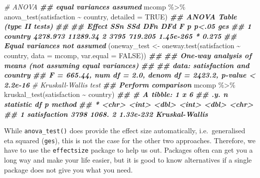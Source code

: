 \documentclass[
]{book}
\newenvironment{Shaded}{\begin{snugshade}}{\end{snugshade}}
\newcommand{\AttributeTok}[1]{\textcolor[rgb]{0.77,0.63,0.00}{#1}}
\newcommand{\CommentTok}[1]{\textcolor[rgb]{0.56,0.35,0.01}{\textit{#1}}}
\newcommand{\ConstantTok}[1]{\textcolor[rgb]{0.00,0.00,0.00}{#1}}
\newcommand{\DocumentationTok}[1]{\textcolor[rgb]{0.56,0.35,0.01}{\textbf{\textit{#1}}}}
\newcommand{\FunctionTok}[1]{\textcolor[rgb]{0.00,0.00,0.00}{#1}}
\newcommand{\NormalTok}[1]{#1}
\newcommand{\OtherTok}[1]{\textcolor[rgb]{0.56,0.35,0.01}{#1}}
\newcommand{\SpecialCharTok}[1]{\textcolor[rgb]{0.00,0.00,0.00}{#1}}
\begin{document}
\begin{Shaded}
\begin{Highlighting}[]
\CommentTok{\# ANOVA}
\DocumentationTok{\#\# equal variances assumed}
\NormalTok{mcomp }\SpecialCharTok{\%\textgreater{}\%}
  \FunctionTok{anova\_test}\NormalTok{(satisfaction }\SpecialCharTok{\textasciitilde{}}\NormalTok{ country,}
              \AttributeTok{detailed =} \ConstantTok{TRUE}\NormalTok{)}
\DocumentationTok{\#\# ANOVA Table (type II tests)}
\DocumentationTok{\#\# }
\DocumentationTok{\#\#    Effect      SSn      SSd DFn  DFd       F         p p\textless{}.05   ges}
\DocumentationTok{\#\# 1 country 4278.973 11289.34   2 3795 719.205 1.45e{-}265     * 0.275}
\DocumentationTok{\#\# Equal variances not assumed}
\NormalTok{(oneway\_test }\OtherTok{\textless{}{-}} \FunctionTok{oneway.test}\NormalTok{(satisfaction }\SpecialCharTok{\textasciitilde{}}\NormalTok{ country,}
            \AttributeTok{data =}\NormalTok{ mcomp,}
            \AttributeTok{var.equal =} \ConstantTok{FALSE}\NormalTok{))}
\DocumentationTok{\#\# }
\DocumentationTok{\#\#  One{-}way analysis of means (not assuming equal variances)}
\DocumentationTok{\#\# }
\DocumentationTok{\#\# data:  satisfaction and country}
\DocumentationTok{\#\# F = 665.44, num df = 2.0, denom df = 2423.2, p{-}value \textless{} 2.2e{-}16}
\CommentTok{\# Kruskall{-}Wallis test}
\DocumentationTok{\#\# Perform comparison}
\NormalTok{mcomp }\SpecialCharTok{\%\textgreater{}\%}
  \FunctionTok{kruskal\_test}\NormalTok{(satisfaction }\SpecialCharTok{\textasciitilde{}}\NormalTok{ country)}
\DocumentationTok{\#\# \# A tibble: 1 x 6}
\DocumentationTok{\#\#   .y.              n statistic    df         p method        }
\DocumentationTok{\#\# * \textless{}chr\textgreater{}        \textless{}int\textgreater{}     \textless{}dbl\textgreater{} \textless{}int\textgreater{}     \textless{}dbl\textgreater{} \textless{}chr\textgreater{}         }
\DocumentationTok{\#\# 1 satisfaction  3798     1068.     2 1.33e{-}232 Kruskal{-}Wallis}
\end{Highlighting}
\end{Shaded}

While \texttt{anova\_test()} does provide the effect size automatically, i.e.~generalised eta squared (\texttt{ges}), this is not the case for the other two approaches. Therefore, we have to use the \texttt{effectsize} package to help us out. Packages often can get you a long way and make your life easier, but it is good to know alternatives if a single package does not give you what you need.
\end{document}

